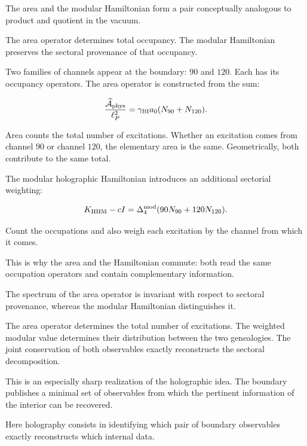 The area and the modular Hamiltonian form a pair conceptually analogous to product and quotient in the vacuum.\par

The area operator determines total occupancy. The modular Hamiltonian preserves the sectoral provenance of that occupancy.\par

Two families of channels appear at the boundary: \(90\) and
\(120\). Each has its occupancy operators. The area operator is
constructed from the sum:\par

\[
\frac{\widehat{\mathcal A}_{\rm phys}}{\ell_P^2}
=
\gamma_{\rm BI}a_0
(N_{90}+N_{120}).
\]

Area counts the total number of excitations. Whether an excitation comes from channel \(90\) or channel \(120\), the elementary area is the same. Geometrically, both contribute to the same total.\par

The modular holographic Hamiltonian introduces an additional sectorial weighting:\par

\[
K_{\rm HHM}-cI
=
\Delta_4^{\rm mod}
(90N_{90}+120N_{120}).
\]

Count the occupations and also weigh each excitation by the channel from which it comes.\par

This is why the area and the Hamiltonian commute: both read the same occupation operators and contain complementary information.\par

The spectrum of the area operator is invariant with respect to sectoral provenance, whereas the modular Hamiltonian distinguishes it.\par

The area operator determines the total number of excitations. The weighted modular value determines their distribution between the two genealogies. The joint conservation of both observables exactly reconstructs the sectoral decomposition.\par

This is an especially sharp realization of the holographic idea. The boundary publishes a minimal set of observables from which the pertinent information of the interior can be recovered.\par

Here holography consists in identifying which pair of boundary observables exactly reconstructs which internal data.\par

